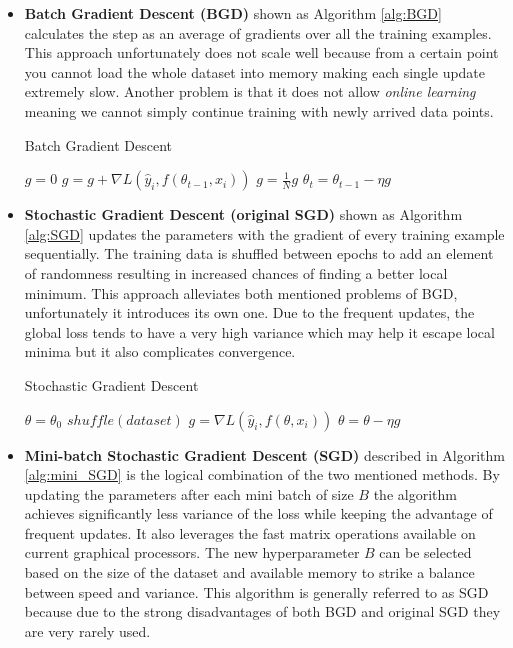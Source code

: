 \documentclass[12pt, titlepage]{article}
\begin{document}
\begin{itemize}
\item \textbf{Batch Gradient Descent (BGD)} shown as Algorithm \ref{alg:BGD} calculates the step as an average of gradients over all the training examples. This approach unfortunately does not scale well because from a certain point you cannot load the whole dataset into memory making each single update extremely slow. Another problem is that it does not allow \textit{online learning} meaning we cannot simply continue training with newly arrived data points.

\begin{algorithm}
  \label{alg:BGD}
  \caption{Batch Gradient Descent}
  \DontPrintSemicolon
  {
  $g = 0$\;
    {
     $g = g + \nabla L(\hat{y}_i,f(\theta_{t-1}, x_i))$\;
    }
  $g = \frac{1}{N} g$\;
  $\theta_t = \theta_{t-1} - \eta g$
  }
\end{algorithm}

\item \textbf{Stochastic Gradient Descent (original SGD)} shown as Algorithm \ref{alg:SGD} updates the parameters with the gradient of every training example sequentially. The training data is shuffled between epochs to add an element of randomness resulting in increased chances of finding a better local minimum. This approach alleviates both mentioned problems of BGD, unfortunately it introduces its own one. Due to the frequent updates, the global loss tends to have a very high variance which may help it escape local minima but it also complicates convergence. 

\begin{algorithm}
  \label{alg:SGD}
  \caption{Stochastic Gradient Descent}
  \DontPrintSemicolon
  $\theta = \theta_0$\;
  {
  $\mathit{shuffle(dataset)}$\;
    {
     $g = \nabla L(\hat{y}_i,f(\theta, x_i))$\;
     $\theta = \theta - \eta g$\;
    }
  }
\end{algorithm}

\item \textbf{Mini-batch Stochastic Gradient Descent (SGD)} described in Algorithm \ref{alg:mini_SGD} is the logical combination of the two mentioned methods. By updating the parameters after each mini batch of size $B$ the algorithm achieves significantly less variance of the loss while keeping the advantage of frequent updates. It also leverages the fast matrix operations available on current graphical processors. The new hyperparameter $B$ can be selected based on the size of the dataset and available memory to strike a balance between speed and variance. This algorithm is generally referred to as SGD because due to the strong disadvantages of both BGD and original SGD they are very rarely used.


\end{itemize}
\end{document}
